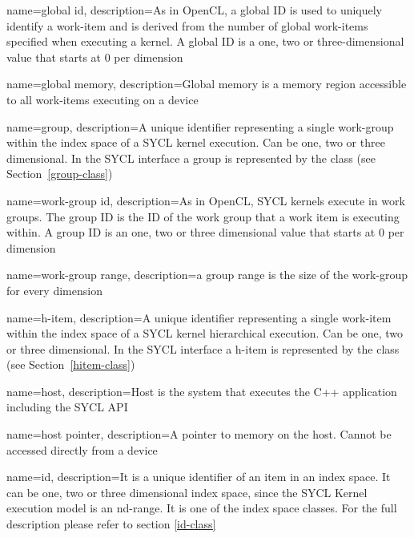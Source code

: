 {
  name={global id},
  description={As in OpenCL, a global ID is used to uniquely identify a
               \gls{work-item} and is derived from the number of
               global \glspl{work-item}
               specified when executing a kernel. A global ID is a one, two or
               three-dimensional value that starts at 0 per dimension}
}

{
  name={global memory},
  description={Global memory is a memory region accessible to all \glspl{work-item}
               executing on a \gls{device}}
}

{
  name={group},
  description={A unique identifier representing a single \gls{work-group}
  within the index space of a SYCL kernel execution. Can be one, two or three
  dimensional. In the SYCL interface a \gls{group} is represented by the
   class (see Section~\ref{group-class})}
}

{
  name={work-group id},
  description={As in OpenCL, SYCL kernels execute in work groups. The group
               ID is the ID of the work group that a work item is executing within.
               A group ID is an one, two or three dimensional value that starts
               at 0 per dimension}
}

{
  name={work-group range},
  description={a group range is the size of the work-group for every dimension}
}

{
  name={h-item},
  description={A unique identifier representing a single \gls{work-item} within
  the index space of a SYCL kernel hierarchical execution. Can be one, two or
  three dimensional. In the SYCL interface a \gls{h-item} is represented by the
   class (see Section~\ref{hitem-class})}
}

{
  name=host,
  description={Host is the system that executes the C++ application including
               the SYCL API}
}

{
  name={host pointer},
  description={A pointer to memory on the host.
        Cannot be accessed directly from a \gls{device}}
}

{
  name=id,
  description={It is a unique identifier of an item in an index space. It can
               be one, two or three dimensional index space, since the SYCL
               Kernel execution model is an nd-range. It is one of the index
               space classes. For the full description please refer to section
         \ref{id-class}}
}

